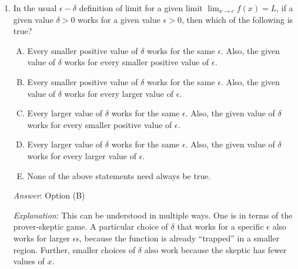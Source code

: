 \documentclass[10pt]{amsart}
\begin{document}
\begin{enumerate}
  {\em Answer}: Option (E)

  {\em Explanation}: Although the usual $\epsilon-\delta$ definition
  uses centered intervals, i.e., intervals centered at the points $c$
  and $L$, this is not a necessary aspect of the definition. So,
  instead of taking centered intervals $(c - \delta, c + \delta)$ or
  $(L - \epsilon,L + \epsilon)$, we could consider open intervals that
  have different amounts on the left and on the right. Thus, all four
  definitions are correct.

  {\em Performance review}: $1$ out of $11$ got this correct. $4$
  chose (B), $3$ chose (A), $2$ chose (D), $1$ chose (C).

  {\em Historical note (last year)}: $6$ out of $26$ people got this
  correct. $9$ people chose (C), $4$ people each chose (A) and (D),
  $2$ chose (B), and $1$ left the question blank.

  {\em Action point}: Revisit this question at the end of the week,
  after we have covered related ideas in class.
\item In the usual $\epsilon-\delta$ definition of limit for a given
  limit $\lim_{x \to c} f(x) = L$, if a given value $\delta > 0$ works
  for a given value $\epsilon > 0$, then which of the following is
  true?
  \begin{enumerate}[(A)]
  \item Every smaller positive value of $\delta$ works for the same
    $\epsilon$. Also, the given value of $\delta$ works for every
    smaller positive value of $\epsilon$.
  \item Every smaller positive value of $\delta$ works for the same
    $\epsilon$. Also, the given value of $\delta$ works for every
    larger value of $\epsilon$.
  \item Every larger value of $\delta$ works for the same
    $\epsilon$. Also, the given value of $\delta$ works for every
    smaller positive value of $\epsilon$.
  \item Every larger value of $\delta$ works for the same
    $\epsilon$. Also, the given value of $\delta$ works for every
    larger value of $\epsilon$.
  \item None of the above statements need always be true.
  \end{enumerate}

  {\em Answer}: Option (B)

  {\em Explanation}: This can be understood in multiple ways. One is
  in terms of the prover-skeptic game. A particular choice of $\delta$
  that works for a specific $\epsilon$ also works for larger
  $\epsilon$s, because the function is already ``trapped'' in a
  smaller region. Further, smaller choices of $\delta$ also work
  because the skeptic has fewer values of $x$.


\end{enumerate}
\end{document}
